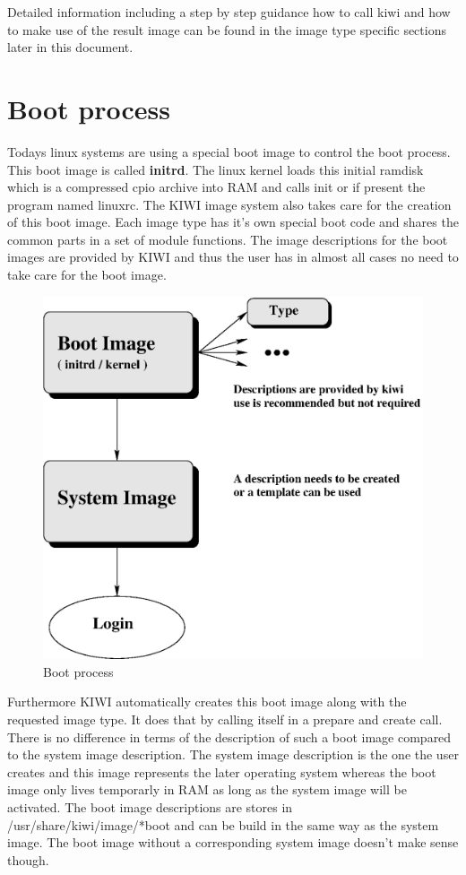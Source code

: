 Detailed information including a step by step guidance how to call
kiwi and how to make use of the result image can be found in the image
type specific sections later in this document.

\section{Boot process}
Todays linux systems are using a special boot image to control the
boot process. This boot image is called \textbf{initrd}. The linux
kernel loads this initial ramdisk which is a compressed cpio archive
into RAM and calls init or if present the program named linuxrc. The
KIWI image system also takes care for the creation of this boot image.
Each image type has it's own special boot code and shares the common
parts in a set of module functions. The image descriptions for the
boot images are provided by KIWI and thus the user has in almost all
cases no need to take care for the boot image.

\begin{figure}[h]
\centering
\includegraphics[scale=0.5]{pictures/activation.eps}
\caption{Boot process}
\label{fig:initrd}
\end{figure}

Furthermore KIWI automatically creates this boot image along with
the requested image type. It does that by calling itself in a prepare
and create call. There is no difference in terms of the description
of such a boot image compared to the system image description. The
system image description is the one the user creates and this image
represents the later operating system whereas the boot image only
lives temporarly in RAM as long as the system image will be activated.
The boot image descriptions are stores in /usr/share/kiwi/image/*boot
and can be build in the same way as the system image. The boot image
without a corresponding system image doesn't make sense though.

